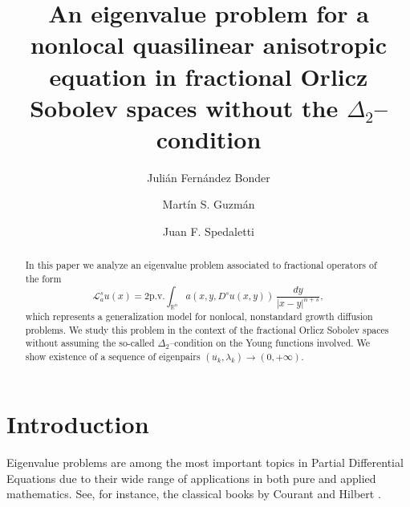 \documentclass{amsart}
\newcommand{\A}{\mathcal{L}_a^s}
\newcommand{\R}{{\mathbb R}}
\theoremstyle{remark}
\theoremstyle{definition}
\numberwithin{equation}{section}
\begin{document}
\title[Nonlocal quasilinear anisotropic equation]{An eigenvalue problem for a nonlocal quasilinear anisotropic equation in fractional Orlicz Sobolev spaces without the $\Delta_2$--condition}
\author{Juli\'an Fern\'andez Bonder}

\address[JFB]{Departamento de Matem\'atica, FCEN, Universidad de Buenos Aires and \hfill\break\indent
Instituto de C\'alculo, CONICET \hfill\break\indent
Ciudad Universitaria, $0+\infty$ Building, Intendente Güiraldes 2160, 
Buenos Aires, Argentina}




\author{Mart\'in S. Guzm\'an}

\address[MG]{Departamento de Matem\'atica, FCFMyN, Universidad Nacional de San
Luis \hfill\break\indent Instituto de Matem\'atica Aplicada San
Luis, IMASL, CONICET. \hfill\break\indent Italia avenue 1556, office
5, San Luis (5700), San Luis, Argentina.}


\author{Juan F. Spedaletti}

\address[JS]{Departamento de Matem\'atica, FCFMyN, Universidad Nacional de San
Luis \hfill\break\indent Instituto de Matem\'atica Aplicada San
Luis, IMASL, CONICET. \hfill\break\indent Italia avenue 1556, office
5, San Luis (5700), San Luis, Argentina.}



\begin{abstract}
In this paper we analyze an eigenvalue problem associated to fractional operators of the form
$$
\A u(x)=2\text{p.v.}\int_{\R^n}a(x,y,D^su(x,y))\,\frac{dy}{|x-y|^{n+s}},
$$
which represents a generalization model for nonlocal, nonstandard growth diffusion problems. We study this problem in the context of the fractional Orlicz Sobolev spaces without assuming the so-called $\Delta_2$--condition on the Young functions involved. We show existence of a sequence of eigenpairs $(u_k,\lambda_k)\to (0,+\infty)$.
\end{abstract}
\maketitle

\section{Introduction}
Eigenvalue problems are among the most important topics in Partial Differential Equations due to their wide range of applications in both pure and applied mathematics. See, for instance, the classical books by Courant and Hilbert \cite{CourantHilbertV1, CourantHilbertV2}.
\end{document}
